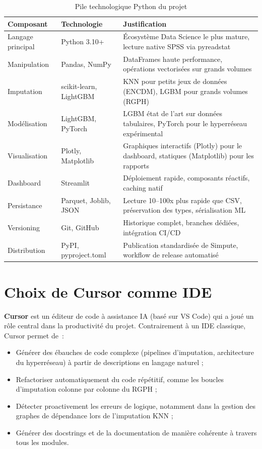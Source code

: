 \documentclass[12pt,a4paper]{report}
\begin{document}
\begin{table}[H]
\centering
\small
\caption{Pile technologique Python du projet}
\label{tab:techstack}
\begin{tabularx}{\textwidth}{@{}L{2.8cm} L{2.8cm} >{\raggedright\arraybackslash}X@{}}
\toprule
\textbf{Composant} & \textbf{Technologie} & \textbf{Justification} \\
\midrule
Langage principal & Python 3.10+ & Écosystème Data Science le plus mature, lecture native SPSS via pyreadstat \\
Manipulation & Pandas, NumPy & DataFrames haute performance, opérations vectorisées sur grands volumes \\
Imputation & scikit-learn, LightGBM & KNN pour petits jeux de données (ENCDM), LGBM pour grands volumes (RGPH) \\
Modélisation & LightGBM, PyTorch & LGBM état de l'art sur données tabulaires, PyTorch pour le hyperréseau expérimental \\
Visualisation & Plotly, Matplotlib & Graphiques interactifs (Plotly) pour le dashboard, statiques (Matplotlib) pour les rapports \\
Dashboard & Streamlit & Déploiement rapide, composants réactifs, caching natif \\
Persistance & Parquet, Joblib, JSON & Lecture 10--100x plus rapide que CSV, préservation des types, sérialisation ML \\
Versioning & Git, GitHub & Historique complet, branches dédiées, intégration CI/CD \\
Distribution & PyPI, pyproject.toml & Publication standardisée de Simpute, workflow de release automatisé \\
\bottomrule
\end{tabularx}
\end{table}

\section{Choix de Cursor comme IDE}

\textbf{Cursor} est un éditeur de code à assistance IA (basé sur VS Code) qui a joué un rôle central dans la productivité du projet. Contrairement à un IDE classique, Cursor permet de~:

\begin{itemize}
  \item Générer des ébauches de code complexe (pipelines d'imputation, architecture du hyperréseau) à partir de descriptions en langage naturel ;
  \item Refactoriser automatiquement du code répétitif, comme les boucles d'imputation colonne par colonne du RGPH ;
  \item Détecter proactivement les erreurs de logique, notamment dans la gestion des graphes de dépendance lors de l'imputation KNN ;
  \item Générer des docstrings et de la documentation de manière cohérente à travers tous les modules.
\end{itemize}
\end{document}
